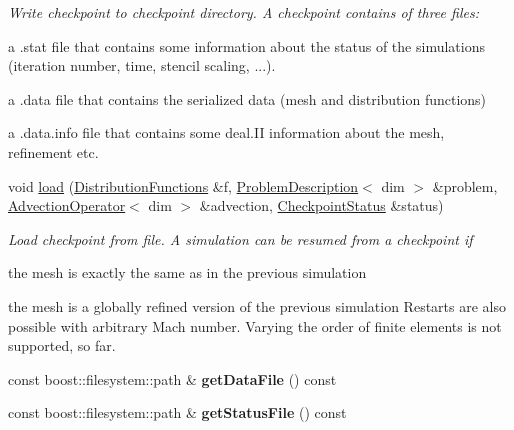 \begin{DoxyCompactItemize}
\begin{DoxyCompactList}\small\item\em Write checkpoint to checkpoint directory. A checkpoint contains of three files:
\begin{DoxyEnumerate}
\item a .stat file that contains some information about the status of the simulations (iteration number, time, stencil scaling, ...).
\item a .data file that contains the serialized data (mesh and distribution functions)
\item a .data.info file that contains some deal.II information about the mesh, refinement etc. 
\end{DoxyEnumerate}\item\end{DoxyCompactList}\item 
\hypertarget{classnatrium_1_1Checkpoint_a71c6fb7d10a93b2dedc981fb9cdbb488}{
void \hyperlink{classnatrium_1_1Checkpoint_a71c6fb7d10a93b2dedc981fb9cdbb488}{load} (\hyperlink{classnatrium_1_1DistributionFunctions}{DistributionFunctions} \&f, \hyperlink{classnatrium_1_1ProblemDescription}{ProblemDescription}$<$ dim $>$ \&problem, \hyperlink{classnatrium_1_1AdvectionOperator}{AdvectionOperator}$<$ dim $>$ \&advection, \hyperlink{structnatrium_1_1CheckpointStatus}{CheckpointStatus} \&status)}
\label{classnatrium_1_1Checkpoint_a71c6fb7d10a93b2dedc981fb9cdbb488}

\begin{DoxyCompactList}\small\item\em Load checkpoint from file. A simulation can be resumed from a checkpoint if
\begin{DoxyEnumerate}
\item the mesh is exactly the same as in the previous simulation
\item the mesh is a globally refined version of the previous simulation Restarts are also possible with arbitrary Mach number. Varying the order of finite elements is not supported, so far. 
\end{DoxyEnumerate}\item\end{DoxyCompactList}\item 
\hypertarget{classnatrium_1_1Checkpoint_a8391abf13cccdac1c3f2ad1ec4596541}{
const boost::filesystem::path \& {\bfseries getDataFile} () const }
\label{classnatrium_1_1Checkpoint_a8391abf13cccdac1c3f2ad1ec4596541}

\item 
\hypertarget{classnatrium_1_1Checkpoint_af2b2fe54ca03a86df627f10848df98c8}{
const boost::filesystem::path \& {\bfseries getStatusFile} () const }
\label{classnatrium_1_1Checkpoint_af2b2fe54ca03a86df627f10848df98c8}

\end{DoxyCompactItemize}
